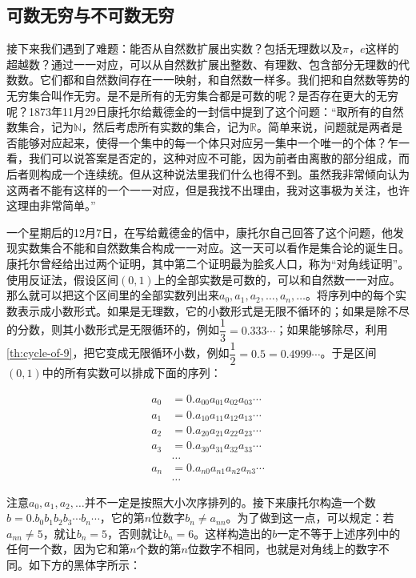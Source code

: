 \documentclass[b5paper]{ctexart}
\begin{document}
\subsection{可数无穷与不可数无穷}
接下来我们遇到了难题：能否从自然数扩展出实数？包括无理数以及$\pi$，$e$这样的超越数？通过一一对应，可以从自然数扩展出整数、有理数、包含部分无理数的代数数。它们都和自然数间存在一一映射，和自然数一样多。我们把和自然数等势的无穷集合叫作无穷。是不是所有的无穷集合都是可数的呢？是否存在更大的无穷呢？1873年11月29日康托尔给戴德金的一封信中提到了这个问题：“取所有的自然数集合，记为$\mathbb{N}$，然后考虑所有实数的集合，记为$\mathbb{R}$。简单来说，问题就是两者是否能够对应起来，使得一个集中的每一个体只对应另一集中一个唯一的个体？乍一看，我们可以说答案是否定的，这种对应不可能，因为前者由离散的部分组成，而后者则构成一个连续统。但从这种说法里我们什么也得不到。虽然我非常倾向认为这两者不能有这样的一个一一对应，但是我找不出理由，我对这事极为关注，也许这理由非常简单。”

一个星期后的12月7日，在写给戴德金的信中，康托尔自己回答了这个问题，他发现实数集合不能和自然数集合构成一一对应。这一天可以看作是集合论的诞生日。康托尔曾经给出过两个证明，其中第二个证明最为脍炙人口，称为“对角线证明”。使用反证法，假设区间$(0, 1)$上的全部实数是可数的，可以和自然数一一对应。那么就可以把这个区间里的全部实数列出来$a_0, a_1, a_2, \dotsc, a_n, \dotsc$。将序列中的每个实数表示成小数形式。如果是无理数，它的小数形式是无限不循环的；如果是除不尽的分数，则其小数形式是无限循环的，例如$\dfrac{1}{3} = 0.333\dotsm$；如果能够除尽，利用\cref{th:cycle-of-9}，把它变成无限循环小数，例如$\dfrac{1}{2} = 0.5 = 0.4999\dotsm$。于是区间$(0, 1)$中的所有实数可以排成下面的序列：

\begin{align*}
a_0 &= 0.a_{00}a_{01}a_{02}a_{03}\dotsm\\
a_1 &= 0.a_{10}a_{11}a_{12}a_{13}\dotsm\\
a_2 &= 0.a_{20}a_{21}a_{22}a_{23}\dotsm\\
a_3 &= 0.a_{30}a_{31}a_{32}a_{33}\dotsm\\
    &\dotso \\
a_n &= 0.a_{n0}a_{n1}a_{n2}a_{n3}\dotsm\\
    &\dotso
\end{align*}

注意$a_0, a_1, a_2, \dotsc$并不一定是按照大小次序排列的。接下来康托尔构造一个数$b = 0.b_0b_1b_2b_3 \dotsm b_n \dotsm$，它的第$n$位数字$b_n \neq a_{nn}$。为了做到这一点，可以规定：若$a_{nn} \neq 5$，就让$b_n = 5$，否则就让$b_n = 6$。这样构造出的$b$一定不等于上述序列中的任何一个数，因为它和第$n$个数的第$n$位数字不相同，也就是对角线上的数字不同。如下方的黑体字所示：
\end{document}
